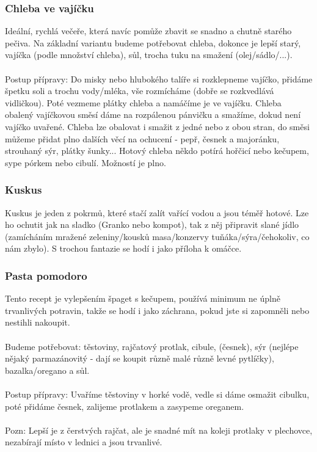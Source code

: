 \subsubsection*{Chleba ve vajíčku}
Ideální, rychlá večeře, která navíc pomůže zbavit se snadno a chutně starého
pečiva. Na základní variantu budeme potřebovat chleba, dokonce je lepší starý,
vajíčka (podle množství chleba), sůl, trocha tuku na smažení (olej/sádlo/...).
\\\\
Postup přípravy: Do misky nebo hlubokého talíře si rozklepneme vajíčko, přidáme
špetku soli a trochu vody/mléka, vše rozmícháme (dobře se rozkvedlává
vidličkou). Poté vezmeme plátky chleba a namáčíme je ve vajíčku. Chleba obalený
vajíčkovou směsí dáme na rozpálenou pánvičku a smažíme, dokud není vajíčko
uvařené. Chleba lze obalovat i smažit z jedné nebo z obou stran, do směsi můžeme
přidat plno dalších věcí na ochucení - pepř, česnek a majoránku, strouhaný sýr,
plátky šunky... Hotový chleba někdo potírá hořčicí nebo kečupem, sype pórkem
nebo cibulí. Možností je plno.


\subsubsection*{Kuskus}
Kuskus je jeden z pokrmů, které stačí zalít vařící vodou a jsou téměř hotové.
Lze ho ochutit jak na sladko (Granko nebo kompot), tak z něj připravit slané
jídlo (zamícháním mražené zeleniny/kousků masa/konzervy tuňáka/sýra/čehokoliv,
co nám zbylo). S trochou fantazie se hodí i jako příloha k omáčce.


\subsubsection*{Pasta pomodoro}
Tento recept je vylepšením špaget s kečupem, používá minimum ne úplně
trvanlivých potravin, takže se hodí i jako záchrana, pokud jste si zapomněli
nebo nestihli nakoupit.
\\\\
Budeme potřebovat: těstoviny, rajčatový protlak, cibule, (česnek), sýr (nejlépe
nějaký parmazánovitý - dají se koupit různě malé různě levné pytlíčky),
bazalka/oregano a sůl.
\\\\
Postup přípravy: Uvaříme těstoviny v horké vodě, vedle si dáme osmažit cibulku,
poté přidáme česnek, zalijeme protlakem a zasypeme oreganem.
\\\\
Pozn: Lepší je z čerstvých rajčat, ale je snadné mít na koleji protlaky v
plechovce, nezabírají místo v lednici a jsou trvanlivé.


